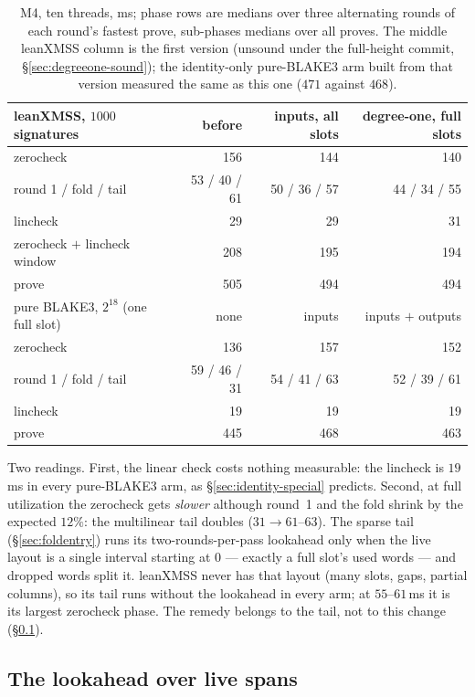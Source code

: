 \documentclass[11pt]{article}
\begin{document}
\begin{table}[h]
\centering
\small
\begin{tabular}{@{}lrrr@{}}
\toprule
leanXMSS, $1000$ signatures & before & inputs, all slots & degree-one, full slots\\
\midrule
zerocheck & 156 & 144 & 140\\
\quad round 1 / fold / tail & 53 / 40 / 61 & 50 / 36 / 57 & 44 / 34 / 55\\
lincheck & 29 & 29 & 31\\
zerocheck $+$ lincheck window & 208 & 195 & 194\\
prove & 505 & 494 & 494\\
\midrule
pure BLAKE3, $2^{18}$ (one full slot) & none & inputs & inputs $+$ outputs\\
\midrule
zerocheck & 136 & 157 & 152\\
\quad round 1 / fold / tail & 59 / 46 / 31 & 54 / 41 / 63 & 52 / 39 / 61\\
lincheck & 19 & 19 & 19\\
prove & 445 & 468 & 463\\
\bottomrule
\end{tabular}
\caption{M4, ten threads, ms; phase rows are medians over three alternating
rounds of each round's fastest prove, sub-phases medians over all proves.
The middle leanXMSS column is the first version (unsound under the
full-height commit, \S\ref{sec:degreeone-sound}); the identity-only
pure-BLAKE3 arm built from that version measured the same as this one
($471$ against $468$).}\label{tab:degreeone}
\end{table}

Two readings. First, the linear check costs nothing measurable: the
lincheck is $19\,$ms in every pure-BLAKE3 arm, as
\S\ref{sec:identity-special} predicts. Second, at full utilization the
zerocheck gets \emph{slower} although round~1 and the fold shrink by the
expected $12\%$: the multilinear tail doubles ($31\to61$--$63$). The sparse
tail (\S\ref{sec:foldentry}) runs its two-rounds-per-pass lookahead only
when the live layout is a single interval starting at $0$ --- exactly a
full slot's used words --- and dropped words split it. leanXMSS never has
that layout (many slots, gaps, partial columns), so its tail runs without
the lookahead in every arm; at $55$--$61\,$ms it is its largest zerocheck
phase. The remedy belongs to the tail, not to this change
(\S\ref{sec:livelookahead}).

\subsection{The lookahead over live spans}\label{sec:livelookahead}
\end{document}
